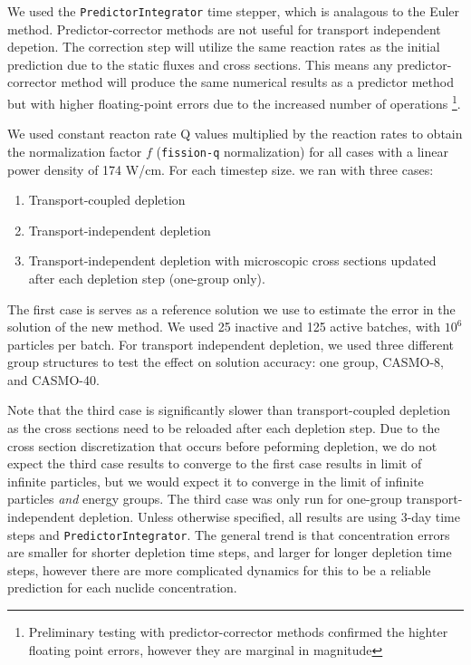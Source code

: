     We used the \verb.PredictorIntegrator. time stepper, which is analagous to
    the Euler method. Predictor-corrector methods are not useful for transport
    independent depetion. The correction step will utilize the same reaction
    rates as the initial prediction due to the static fluxes and cross sections.
    This means any predictor-corrector method will produce the same numerical
    results as a predictor method but with higher floating-point errors due to
    the increased number of operations \footnote{Preliminary testing with
    predictor-corrector methods confirmed the highter floating point errors,
    however they are marginal in magnitude}.

    We used constant reacton rate Q values multiplied by the reaction rates to
    obtain the normalization factor $f$ (\verb.fission-q. normalization) for all
    cases with a linear power density of 174 W/cm. For each timestep size.
    we ran with three cases:
    \begin{enumerate}
        \item Transport-coupled depletion
        \item Transport-independent depletion
        \item Transport-independent depletion with microscopic cross sections
            updated after each depletion step (one-group only).
    \end{enumerate}

    The first case is serves as a reference solution we use to estimate the
    error in the solution of the new method. We used 25 inactive and 125 active
    batches, with $10^6$ particles per batch. For transport independent
    depletion, we used three different group structures to test the effect on
    solution accuracy: one group, CASMO-8, and CASMO-40.

    Note that the third case is significantly slower than transport-coupled
    depletion as the cross sections need to be reloaded after each depletion
    step. Due to the cross section discretization that occurs before peforming
    depletion, we do not expect the third case results to converge to the first
    case results in limit of infinite particles, but we would expect it to
    converge in the limit of infinite particles {\it and} energy groups. The
    third case was only run for one-group transport-independent depletion.
    Unless otherwise specified, all results are using 3-day time steps and
    \verb,PredictorIntegrator,. The general trend is that concentration errors
    are smaller for shorter depletion time steps, and larger for longer
    depletion time steps, however there are more complicated dynamics for this
    to be a reliable prediction for each nuclide concentration.

